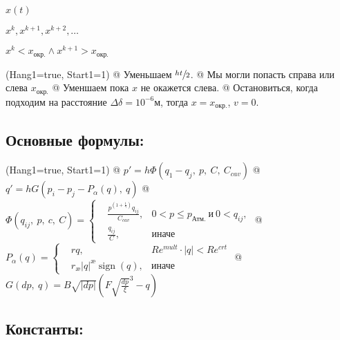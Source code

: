 \documentclass[12pt, a4paper]{article}
\DeclareMathOperator{\sign}{sign}
\begin{document}
$ x(t) $

$ x^k, x^{k+1}, x^{k+2}, \dots $

$ x^k < x_\text{окр.} \wedge x^{k+1} > x_\text{окр.} $

\noindent\begin{easylist}
\ListProperties(Hang1=true, Start1=1)
@ Уменьшаем $\sfrac{ht}{2}$.
@ Мы могли попасть справа или слева $x_\text{окр.}$
@ Уменшаем пока $x$ не окажется слева.
@ Остановиться, когда подходим на расстояние $\Delta\delta = 10^{-6} \text{м}$, тогда $x = x_{\text{окр.}}$, $v = 0$.
\end{easylist}




\subsection{Основные формулы:}

\noindent\begin{easylist}
\ListProperties(Hang1=true, Start1=1)
@ $ p' = h \Phi(q_1 - q_j,\ p,\ C,\ C_{cav}) $
@ $ q' = h G(p_i-p_j-P_\alpha(q),\ q) $
@ $
\Phi(q_{ij},\ p,\ c,\ C) = \left\{
\begin{aligned}
&\frac{p^{\left(1+\frac{1}{\gamma}\right)}q_{ij}}{C_{cav}},  & 0 < p \leqslant p_{\text{Атм.}}\ \text{и} \ 0 < q_{ij}, \\
& \frac{q_{ij}}{C}, & \text{иначе}
\end{aligned}
\right.
$
@ $
P_\alpha(q) = \left\{
\begin{aligned}
&rq,  &Re^{mult} \cdot |q| < Re^{crt} \\
&r_\text{\ae}|q|^\text{\ae}\sign(q), & \text{иначе}
\end{aligned}
\right.
$
@ $ G(dp,\ q) = B\sqrt{|dp|}(F\sqrt{\frac{dp}{\xi}}^3 - q) $
\end{easylist}




\subsection{Константы:}
\end{document}
